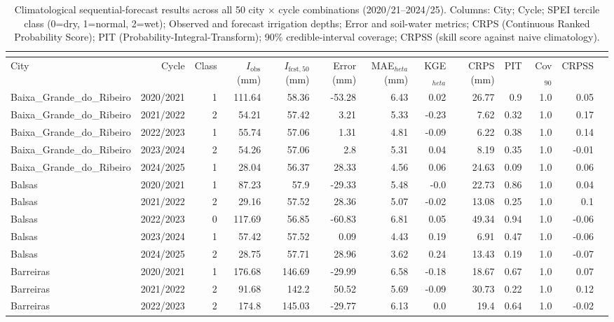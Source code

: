 \begin{longtable}{lrrrrrrrrrrrr}
\caption{Climatological sequential-forecast results across all 50 city $\times$ cycle combinations (2020/21--2024/25). Columns: City; Cycle; SPEI tercile class (0=dry, 1=normal, 2=wet); Observed and forecast irrigation depths; Error and soil-water metrics; CRPS (Continuous Ranked Probability Score); PIT (Probability-Integral-Transform); 90\% credible-interval coverage; CRPSS (skill score against naive climatology).}\\ 
\label{tab:sequential_all_cities}\\ 
\toprule
City & Cycle & Class & $I_{\mathrm{obs}}$ (mm) & $I_{\mathrm{fcst,50}}$ (mm) & Error (mm) & MAE$_{	heta}$ (mm) & KGE$_{	heta}$ & CRPS (mm) & PIT & Cov$_{90}$ & CRPSS \\ 
\midrule
\endhead
Baixa_Grande_do_Ribeiro & 2020/2021 & 1 & 111.64 & 58.36 & -53.28 & 6.43 & 0.02 & 26.77 & 0.9 & 1.0 & 0.05 \\ 
Baixa_Grande_do_Ribeiro & 2021/2022 & 2 & 54.21 & 57.42 & 3.21 & 5.33 & -0.23 & 7.62 & 0.32 & 1.0 & 0.17 \\ 
Baixa_Grande_do_Ribeiro & 2022/2023 & 1 & 55.74 & 57.06 & 1.31 & 4.81 & -0.09 & 6.22 & 0.38 & 1.0 & 0.14 \\ 
Baixa_Grande_do_Ribeiro & 2023/2024 & 2 & 54.26 & 57.06 & 2.8 & 5.31 & 0.04 & 8.19 & 0.35 & 1.0 & -0.01 \\ 
Baixa_Grande_do_Ribeiro & 2024/2025 & 1 & 28.04 & 56.37 & 28.33 & 4.56 & 0.06 & 24.63 & 0.09 & 1.0 & 0.06 \\ 
Balsas & 2020/2021 & 1 & 87.23 & 57.9 & -29.33 & 5.48 & -0.0 & 22.73 & 0.86 & 1.0 & 0.04 \\ 
Balsas & 2021/2022 & 2 & 29.16 & 57.52 & 28.36 & 5.07 & -0.02 & 13.08 & 0.25 & 1.0 & 0.1 \\ 
Balsas & 2022/2023 & 0 & 117.69 & 56.85 & -60.83 & 6.81 & 0.05 & 49.34 & 0.94 & 1.0 & -0.06 \\ 
Balsas & 2023/2024 & 1 & 57.42 & 57.52 & 0.09 & 4.43 & 0.19 & 6.91 & 0.47 & 1.0 & -0.06 \\ 
Balsas & 2024/2025 & 2 & 28.75 & 57.71 & 28.96 & 3.62 & 0.24 & 13.43 & 0.19 & 1.0 & -0.07 \\ 
Barreiras & 2020/2021 & 1 & 176.68 & 146.69 & -29.99 & 6.58 & -0.18 & 18.67 & 0.67 & 1.0 & 0.07 \\ 
Barreiras & 2021/2022 & 2 & 91.68 & 142.2 & 50.52 & 5.69 & -0.09 & 30.73 & 0.22 & 1.0 & 0.12 \\ 
Barreiras & 2022/2023 & 2 & 174.8 & 145.03 & -29.77 & 6.13 & 0.0 & 19.4 & 0.64 & 1.0 & -0.02 \\ 

\end{longtable}
